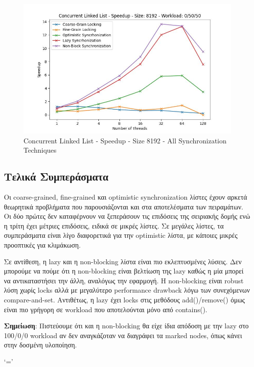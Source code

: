 \documentclass[../final_report.tex]{subfiles}
\begin{document}
\begin{figure}[H]
        \includegraphics[scale=0.4]{outFiles/plots/concurrent_data_structs_all_speedup_8192_0_50_50.jpg}
    \caption{Concurrent Linked List - Speedup - Size 8192 - All Synchronization Techniques}
    \label{fig:Concurrent Linked List - Speedup - Size 8192 - All Synchronization Techniques}
\end{figure}

\subsection*{Τελικά Συμπεράσματα}
Οι coarse-grained, fine-grained και optimistic synchronization λίστες έχουν αρκετά θεωρητικά προβλήματα που παρουσιάζονται
και στα αποτελέσματα των πειραμάτων. Οι δύο πρώτες δεν καταφέρνουν να ξεπεράσουν τις επιδόσεις της σειριακής δομής ενώ η τρίτη
έχει μέτριες επιδόσεις, ειδικά σε μικρές λίστες. Σε μεγάλες λίστες, τα συμπεράσματα είναι λίγο διαφορετικά για την optimistic λίστα, με
κάποιες μικρές προοπτικές για κλιμάκωση.

Σε αντίθεση, η lazy και η non-blocking λίστα είναι πιο εκλεπτυσμένες λύσεις.
Δεν μπορούμε να πούμε ότι η non-blocking είναι βελτίωση της lazy καθώς η μία μπορεί να αντικαταστήσει την άλλη, αναλόγως την εφαρμογή.
Η non-blocking είναι robust λύση χωρίς locks αλλά με μεγαλύτερο performance drawback λόγω των συνεχόμενων compare-and-set. Αντιθέτως, η
lazy έχει locks στις μεθόδους add()/remove() όμως είναι πιο γρήγορη σε workload που αποτελούνται μόνο από contains().

\textbf{Σημείωση}: Πιστεύουμε ότι και η non-blocking θα είχε ίδια απόδοση με την lazy στο 100/0/0 workload αν δεν αναγκάζοταν να διαγράφει
τα marked nodes, όπως κάνει στην δοσμένη υλοποίηση.

`='
\end{document}
